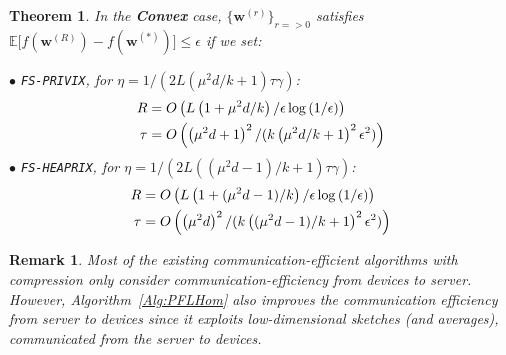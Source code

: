 \documentclass[twoside]{article}
\newtheorem{theorem}{Theorem}
\newtheorem{remark}{Remark}
\begin{document}
\begin{theorem}
In the \textbf{Convex} case, $\{ {\boldsymbol{w}}^{(r)}\}_{r=>0}$ satisfies $ \mathbb{E}\Big[f({\boldsymbol{w}}^{(R)})-f({\boldsymbol{w}}^{(*)})\Big]\leq \epsilon$ if we set:  

\noindent $\bullet$ \texttt{FS-PRIVIX}, for $\eta=1/(2L(\mu^2d/k+1)\tau\gamma)$:    
\begin{equation}\notag
\begin{split}
R& =O\left(L\left(1+\mu^2d/k\right)/\epsilon\log\left(1/\epsilon \right)\right)\\
\tau&=O\left(\left(\mu^2d+1\right)^2/(k\left(\mu^2d/k+1\right)^2\epsilon^2)\right)
 \end{split}
\end{equation}
\noindent $\bullet$ \texttt{FS-HEAPRIX}, for $\eta=1/(2L((\mu^2d-1)/k+1)\tau\gamma)$:   
\begin{equation}\notag
\begin{split}
R& =O\left(L\left(1+(\mu^2d-1)/k\right)/\epsilon\log\left(1/\epsilon \right)\right)\\
 \tau&=O\left(\left(\mu^2d\right)^2/(k\left((\mu^2d-1)/k+1\right)^2\epsilon^2)\right)
 \end{split}
\end{equation}
\end{theorem}


\begin{remark}
Most of the existing communication-efficient algorithms with compression only consider communication-efficiency from devices to server. 
However, Algorithm~\ref{Alg:PFLHom} also improves the communication efficiency from server to devices since it exploits low-dimensional sketches (and averages), communicated from the server to devices. 
\end{remark}
\end{document}
